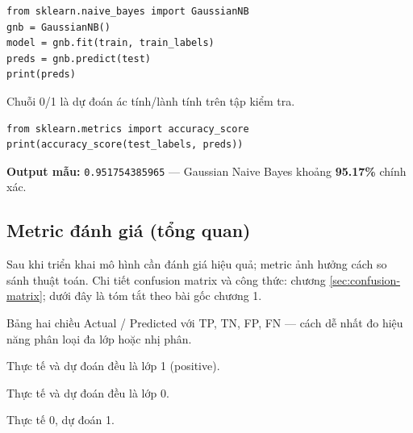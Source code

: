 \begin{vidu}[title={Bước 4: Naive Bayes và dự đoán}]
\begin{lstlisting}
from sklearn.naive_bayes import GaussianNB
gnb = GaussianNB()
model = gnb.fit(train, train_labels)
preds = gnb.predict(test)
print(preds)
\end{lstlisting}
Chuỗi 0/1 là dự đoán ác tính/lành tính trên tập kiểm tra.
\end{vidu}

\begin{vidu}[title={Bước 5: Accuracy}]
\begin{lstlisting}
from sklearn.metrics import accuracy_score
print(accuracy_score(test_labels, preds))
\end{lstlisting}
\textbf{Output mẫu:} \texttt{0.951754385965} --- Gaussian Naive Bayes khoảng \textbf{95.17\%} chính xác.
\end{vidu}

\subsection{Metric đánh giá (tổng quan)}

\begin{phuongphap}[title={Chọn metric}]
Sau khi triển khai mô hình cần đánh giá hiệu quả; metric ảnh hưởng cách so sánh thuật toán.
Chi tiết confusion matrix và công thức: chương \ref{sec:confusion-matrix}; dưới đây là tóm tắt theo bài gốc chương 1.
\end{phuongphap}

\begin{dinhnghia}[title={Confusion Matrix}]
Bảng hai chiều Actual / Predicted với TP, TN, FP, FN --- cách dễ nhất đo hiệu năng phân loại đa lớp hoặc nhị phân.
\end{dinhnghia}


\begin{tinhchat}[title={True Positive (TP)}]
Thực tế và dự đoán đều là lớp 1 (positive).
\end{tinhchat}

\begin{tinhchat}[title={True Negative (TN)}]
Thực tế và dự đoán đều là lớp 0.
\end{tinhchat}

\begin{tinhchat}[title={False Positive (FP)}]
Thực tế 0, dự đoán 1.
\end{tinhchat}

